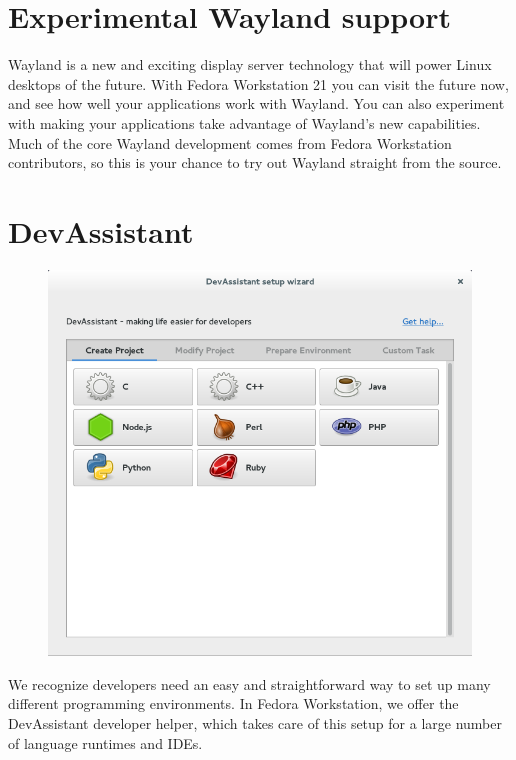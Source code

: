 \documentclass[
10pt
]{leaflet}
\begin{document}
\section{\textcolor{FedoraBlue}{Experimental Wayland support}}
Wayland is a new and exciting display server technology that will power Linux desktops of the future. With Fedora Workstation 21 you can visit the future now, and see how well your applications work with Wayland. You can also experiment with making your applications take advantage of Wayland's new capabilities. Much of the core Wayland development comes from Fedora Workstation contributors, so this is your chance to try out Wayland straight from the source.



\section{\textcolor{FedoraBlue}{DevAssistant}}
\begin{figure}[h]
  \includegraphics[keepaspectratio,width=\textwidth]{Fedora_devassistant-cropped.png}
\end{figure}
We recognize developers need an easy and straightforward way to set up many different programming environments. In Fedora Workstation, we offer the DevAssistant developer helper, which takes care of this setup for a large number of language runtimes and IDEs.
\end{document}
